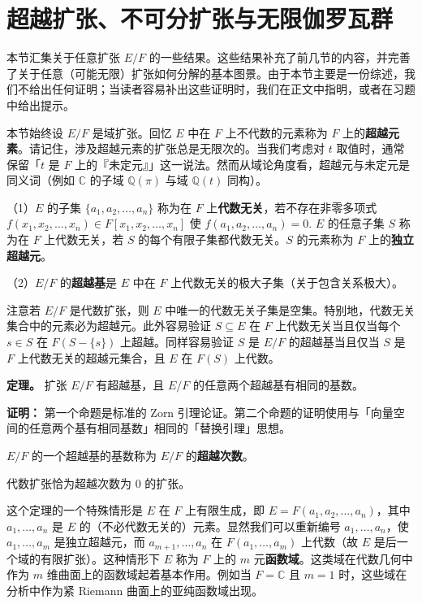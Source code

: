 \section{超越扩张、不可分扩张与无限伽罗瓦群}

本节汇集关于任意扩张 \(E/F\) 的一些结果。这些结果补充了前几节的内容，并完善了关于任意（可能无限）扩张如何分解的基本图景。由于本节主要是一份综述，我们不给出任何证明；当读者容易补出这些证明时，我们在正文中指明，或者在习题中给出提示。

本节始终设 \(E/F\) 是域扩张。回忆 \(E\) 中在 \(F\) 上不代数的元素称为 \(F\) 上的\textbf{超越元素}。请记住，涉及超越元素的扩张总是无限次的。当我们考虑对 \(t\) 取值时，通常保留「\(t\) 是 \(F\) 上的『未定元』」这一说法。然而从域论角度看，超越元与未定元是同义词（例如 \(\mathbb{C}\) 的子域 \(\mathbb{Q}(\pi)\) 与域 \(\mathbb{Q}(t)\) 同构）。

\begin{definition}
（1）\(E\) 的子集 \(\{a_1, a_2, \ldots, a_n\}\) 称为在 \(F\) 上\textbf{代数无关}，若不存在非零多项式 \(f(x_1, x_2, \ldots, x_n) \in F[x_1, x_2, \ldots, x_n]\) 使 \(f(a_1, a_2, \ldots, a_n) = 0\). \(E\) 的任意子集 \(S\) 称为在 \(F\) 上代数无关，若 \(S\) 的每个有限子集都代数无关。\(S\) 的元素称为 \(F\) 上的\textbf{独立超越元}。

（2）\(E/F\) 的\textbf{超越基}是 \(E\) 中在 \(F\) 上代数无关的极大子集（关于包含关系极大）。
\end{definition}

注意若 \(E/F\) 是代数扩张，则 \(E\) 中唯一的代数无关子集是空集。特别地，代数无关集合中的元素必为超越元。此外容易验证 \(S \subseteq E\) 在 \(F\) 上代数无关当且仅当每个 \(s \in S\) 在 \(F(S-\{s\})\) 上超越。同样容易验证 \(S\) 是 \(E/F\) 的超越基当且仅当 \(S\) 是 \(F\) 上代数无关的超越元集合，且 \(E\) 在 \(F(S)\) 上代数。

\noindent\textbf{定理。} 扩张 \(E/F\) 有超越基，且 \(E/F\) 的任意两个超越基有相同的基数。

\noindent\textbf{证明：} 第一个命题是标准的 Zorn 引理论证。第二个命题的证明使用与「向量空间的任意两个基有相同基数」相同的「替换引理」思想。

\begin{definition}
\(E/F\) 的一个超越基的基数称为 \(E/F\) 的\textbf{超越次数}。
\end{definition}

代数扩张恰为超越次数为 0 的扩张。

这个定理的一个特殊情形是 \(E\) 在 \(F\) 上有限生成，即 \(E = F(a_1, a_2, \ldots, a_n)\)，其中 \(a_1, \ldots, a_n\) 是 \(E\) 的（不必代数无关的）元素。显然我们可以重新编号 \(a_1, \ldots, a_n\)，使 \(a_1, \ldots, a_m\) 是独立超越元，而 \(a_{m+1}, \ldots, a_n\) 在 \(F(a_1, \ldots, a_m)\) 上代数（故 \(E\) 是后一个域的有限扩张）。这种情形下 \(E\) 称为 \(F\) 上的 \(m\) 元\textbf{函数域}。这类域在代数几何中作为 \(m\) 维曲面上的函数域起着基本作用。例如当 \(F = \mathbb{C}\) 且 \(m = 1\) 时，这些域在分析中作为紧 Riemann 曲面上的亚纯函数域出现。

